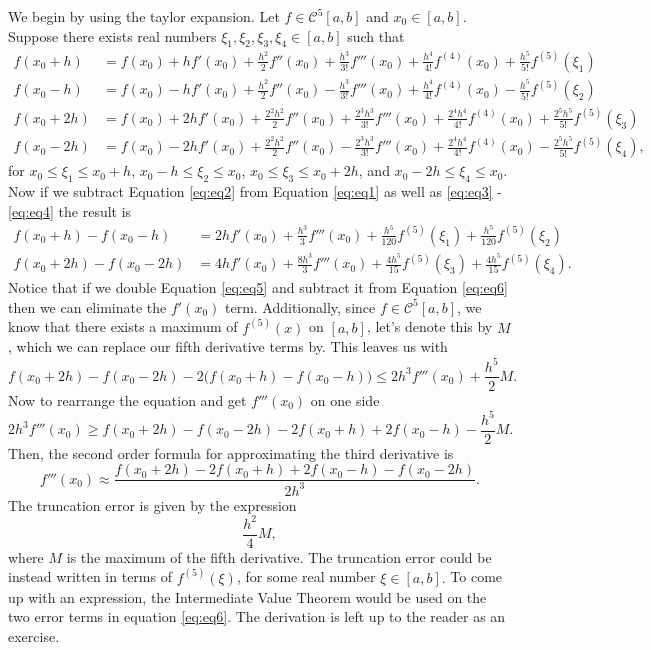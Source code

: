 \documentclass{article}
\begin{document}
\begin{enumerate}[label = \arabic*]
\begin{enumerate}
			\hspace{15pt} We begin by using the taylor expansion. Let $f \in \mathcal{C}^5[a, b]$ and $x_0 \in [a, b]$. Suppose there exists real numbers $\xi_1, \xi_2, \xi_3,\xi_4 \in [a, b]$ such that
			\begin{align}
				f(x_0 +  h) &= f(x_0) + hf'(x_0) + \frac{h^2}{2}f''(x_0) + \frac{h^3}{3!}f'''(x_0) + \frac{h^4}{4!}f^{(4)}(x_0) + \frac{h^5}{5!}f^{(5)}(\xi_1) \label{eq:eq1} \\
				f(x_0 -  h) &= f(x_0) - hf'(x_0) + \frac{h^2}{2}f''(x_0) - \frac{h^3}{3!}f'''(x_0) + \frac{h^4}{4!}f^{(4)}(x_0) - \frac{h^5}{5!}f^{(5)}(\xi_2) \label{eq:eq2} \\
				f(x_0 + 2h) &= f(x_0) + 2hf'(x_0) + \frac{2^2h^2}{2}f''(x_0) + \frac{2^3h^3}{3!}f'''(x_0) + \frac{2^4h^4}{4!}f^{(4)}(x_0) + \frac{2^5h^5}{5!}f^{(5)}(\xi_3) \label{eq:eq3} \\
				f(x_0 - 2h) &= f(x_0) - 2hf'(x_0) + \frac{2^2h^2}{2}f''(x_0) - \frac{2^3h^3}{3!}f'''(x_0) + \frac{2^4h^4}{4!}f^{(4)}(x_0) - \frac{2^5h^5}{5!}f^{(5)}(\xi_4) \label{eq:eq4},
			\end{align}
			for $ x_0 \leq \xi_1 \leq x_0 + h$, $ x_0 - h \leq \xi_2 \leq x_0$, $ x_0 \leq \xi_3 \leq x_0 + 2h $, and $x_0 - 2h \leq \xi_4 \leq x_0$.
			Now if we subtract Equation \ref{eq:eq2} from Equation \ref{eq:eq1} as well as \ref{eq:eq3} - \ref{eq:eq4} the result is
			\begin{align}
				f(x_0 +  h) - f(x_0 -  h) &= 2hf'(x_0) + \frac{h^3}{3}f'''(x_0) + \frac{h^5}{120}f^{(5)}(\xi_1) + \frac{h^5}{120}f^{(5)}(\xi_2) \label{eq:eq5} \\
				f(x_0 + 2h) - f(x_0 - 2h) &= 4hf'(x_0) + \frac{8h^3}{3}f'''(x_0) + \frac{4h^5}{15}f^{(5)}(\xi_3) + \frac{4h^5}{15}f^{(5)}(\xi_4). \label{eq:eq6}
			\end{align}
			Notice that if we double Equation \ref{eq:eq5} and subtract it from Equation \ref{eq:eq6} then we can eliminate the $f'(x_0)$ term. Additionally, since $f \in \mathcal{C}^5[a, b]$, we know that there exists a maximum of $f^{(5)}(x)$ on $[a, b]$, let's denote this by $M$, which we can replace our fifth derivative terms by. This leaves us with \[f(x_0 + 2h) - f(x_0 - 2h) - 2\Big(f(x_0 +  h) - f(x_0 -  h)\Big) \leq 2h^3 f'''(x_0) + \frac{h^5}{2}M.\] Now to rearrange the equation and get $f'''(x_0)$ on one side \[2h^3f'''(x_0) \geq f(x_0 + 2h) - f(x_0 - 2h) - 2f(x_0 +  h) + 2f(x_0 -  h) - \frac{h^5}{2}M.\] Then, the second order formula for approximating the third derivative is \[f'''(x_0) \approx \frac{f(x_0 + 2h) - 2f(x_0 +  h) + 2f(x_0 -  h) - f(x_0 - 2h)}{2h^3}.\] The truncation error is given by the expression \[\frac{h^2}{4}M,\] where $M$ is the maximum of the fifth derivative. The truncation error could be instead written in terms of $f^{(5)}(\xi)$, for some real number $\xi \in [a, b].$ To come up with an expression, the Intermediate Value Theorem would be used on the two error terms in equation \ref{eq:eq6}. The derivation is left up to the reader as an exercise. \\
			

\end{enumerate}
\end{enumerate}
\end{document}
